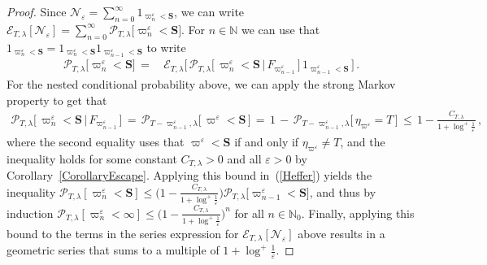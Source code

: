 \documentclass[10pt]{article}
\numberwithin{equation}{section}
\theoremstyle{definition}
\begin{document}
\begin{proof} Since $  \mathscr{N}_{\varepsilon}=\sum_{n=0}^{\infty}  1_{  \varpi_{n}^{\varepsilon}<\mathbf{S} }  $, we can write
$    \mathcal{E}_{T,\lambda}[  \mathscr{N}_{\varepsilon} ]=\sum_{n=0}^{\infty} \mathcal{P}_{T,\lambda}\big[  \varpi_{n}^{\varepsilon}   <\mathbf{S}\big]
$.
For $n\in \mathbb{N}$ we can use that $ 1_{ \varpi_{n}^{\varepsilon}<\mathbf{S}  }=1_{ \varpi_{n}^{\varepsilon}<\mathbf{S}  }  1_{ \varpi_{n-1}^{\varepsilon}<\mathbf{S} }$ to write
\begin{align}\label{Heffer}
  \mathcal{P}_{T,\lambda}\big[  \varpi_{n}^{\varepsilon}   <\mathbf{S} \big] \,=\,&  \mathcal{E}_{T,\lambda}\Big[\,   \mathcal{P}_{T,\lambda}\big[\,\varpi_{n}^{\varepsilon}<\mathbf{S}  \,\big|\,   F_{ \varpi_{n-1}^{\varepsilon} }\,\big]\, 1_{ \varpi_{n-1}^{\varepsilon}<\mathbf{S}  } \,\Big] \,.
  \end{align}
For the nested conditional probability above, we can apply  the strong Markov property to get that
 \begin{align*}
   \mathcal{P}_{T,\lambda}\big[\,\varpi_{n}^{\varepsilon}<\mathbf{S} \,\big|\,   F_{ \varpi_{n-1}^{\varepsilon} }\,\big]\,=\, \mathcal{P}_{T-\varpi_{n-1}^{\varepsilon},\lambda}\big[\,\varpi^{\varepsilon}<\mathbf{S}\, \big] \,=\, 1\,-\,\mathcal{P}_{T-\varpi_{n-1}^{\varepsilon},\lambda}\big[\,\eta_{\varpi^{\varepsilon}  }= T\,\big] 
    \,\leq\, 1- \frac{C_{T,\lambda}  }{ 1+\log^+ \frac{1}{\varepsilon}  } \,, \nonumber
\end{align*}
where the second equality uses that $\varpi^{\varepsilon}<\mathbf{S} $ if and only if $\eta_{\varpi^{\varepsilon}  }\neq T$, and the inequality holds for some constant $C_{T,\lambda}>0$ and all $\varepsilon>0$ by Corollary~\ref{CorollaryEscape}. Applying this bound in~(\ref{Heffer}) yields the  inequality 
 $
  \mathcal{P}_{T,\lambda}[  \varpi_{n}^{\varepsilon}   < \mathbf{S} ] 
    \leq  \big(1-\frac{C_{T,\lambda}  }{ 1+\log^+ \frac{1}{\varepsilon} } \big)\mathcal{P}_{T,\lambda}\big[   \varpi_{n-1}^{\varepsilon}<\mathbf{S}  \big] $, and thus by induction $
   \mathcal{P}_{T,\lambda}[  \varpi_{n}^{\varepsilon}   <\infty ] \leq  \big(1-\frac{C_{T,\lambda}  }{ 1+\log^+ \frac{1}{\varepsilon}  } \big)^n
$ for all $n\in \mathbb{N}_0$. Finally, applying this bound to the terms in the series expression  for $ \mathcal{E}_{T,\lambda}[  \mathscr{N}_{\varepsilon} ]$ above results in a geometric series that sums to a multiple of $1+\log^+ \frac{1}{\varepsilon}$.
\end{proof}
\end{document}
